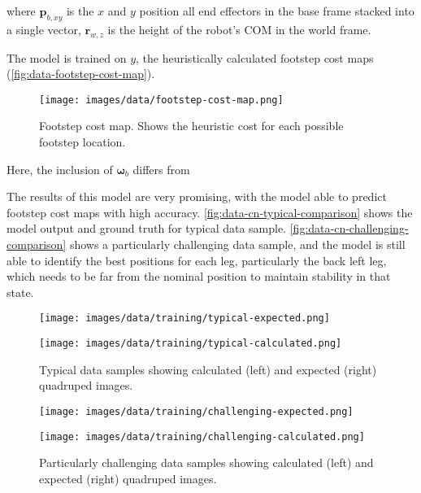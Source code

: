 where
$\mathbf p_{b,xy}$ is the $x$ and $y$ position all end effectors in
the base frame stacked into a single vector,
$\mathbf r_{w,z}$ is the height of the robot's COM in the world frame.

The model is trained on $y$, the heuristically calculated footstep
cost maps (\autoref{fig:data-footstep-cost-map}).

\begin{figure}
  \centering
  \texttt{[image: images/data/footstep-cost-map.png]}
  \caption{Footstep cost map. Shows the heuristic cost for each
  possible footstep location.}
  \label{fig:data-footstep-cost-map}
\end{figure}

Here, the inclusion of $\mathbf \omega_b$ differs from
\cite{bratta_contactnet_2024}

The results of this model are very promising, with the model able to
predict footstep cost maps with high accuracy.
\autoref{fig:data-cn-typical-comparison}
shows the model output and ground truth for typical data sample.
\autoref{fig:data-cn-challenging-comparison}
shows a particularly challenging data sample, and the model is still
able to identify the best positions for each leg,
particularly the back left leg, which needs to be far from the
nominal position to maintain stability in that state.

\begin{figure}
  \centering
  \begin{minipage}[T]{0.45\textwidth}
    \centering
    \texttt{[image: images/data/training/typical-expected.png]}
  \end{minipage}
  \hfill
  \begin{minipage}[T]{0.45\textwidth}
    \centering
    \texttt{[image: images/data/training/typical-calculated.png]}
  \end{minipage}
  \hfill

  \caption{Typical data samples showing calculated (left) and
  expected (right) quadruped images.}
  \label{fig:data-cn-typical-comparison}
\end{figure}

\begin{figure}
  \centering
  \begin{minipage}[T]{0.45\textwidth}
    \centering
    \texttt{[image: images/data/training/challenging-expected.png]}
  \end{minipage}
  \hfill
  \begin{minipage}[T]{0.45\textwidth}
    \centering
    \texttt{[image: images/data/training/challenging-calculated.png]}
  \end{minipage}
  \hfill

  \caption{Particularly challenging data samples showing calculated (left) and
  expected (right) quadruped images.}
  \label{fig:data-cn-challenging-comparison}
\end{figure}
